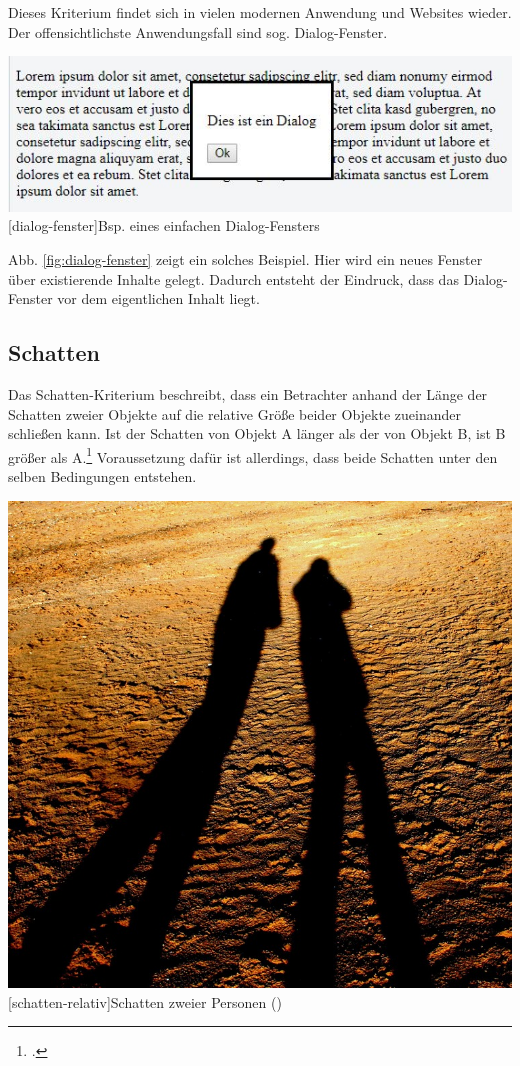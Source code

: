 Dieses Kriterium findet sich in vielen modernen Anwendung und Websites wieder. Der offensichtlichste Anwendungsfall sind sog. Dialog-Fenster.

\vspace{1em}
\begin{minipage}{\linewidth}
	\centering
	\includegraphics[width=0.7\linewidth]{images/dialog_fenster.jpg}
	[dialog-fenster]{Bsp. eines einfachen Dialog-Fensters}
	\label{fig:dialog-fenster}
\end{minipage}
\vspace{1em} 

Abb. \ref{fig:dialog-fenster} zeigt ein solches Beispiel. Hier wird ein neues Fenster über existierende Inhalte gelegt. Dadurch entsteht der Eindruck, dass das Dialog-Fenster vor dem eigentlichen Inhalt liegt.

\subsection{Schatten}
Das Schatten-Kriterium beschreibt, dass ein Betrachter anhand der Länge der Schatten zweier Objekte auf die relative Größe beider Objekte zueinander schließen kann. Ist der Schatten von Objekt A länger als der von Objekt B, ist B größer als A.\footcite[Vgl.][S.43]{Gras16} Voraussetzung dafür ist allerdings, dass beide Schatten unter den selben Bedingungen entstehen.\\

\vspace{1em}
\begin{minipage}{\linewidth}
	\centering
	\includegraphics[width=0.7\linewidth]{images/schatten_personen.jpg}
	[schatten-relativ]{Schatten zweier Personen (\cite{PixaXX})}
	\label{fig:schatten-relativ}
\end{minipage}
\vspace{1em} 

